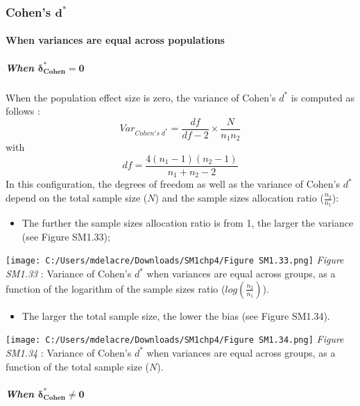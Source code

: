 \documentclass[
  english,
  man,mask,floatsintext]{apa6}
\providecommand{\tightlist}{%
  \setlength{\itemsep}{0pt}\setlength{\parskip}{0pt}}
\let\oldparagraph\paragraph
\renewcommand{\paragraph}[1]{\oldparagraph{#1}\mbox{}}
\let\oldsubparagraph\subparagraph
\renewcommand{\subparagraph}[1]{\oldsubparagraph{#1}\mbox{}}
\begin{document}
\hypertarget{cohens-bmd-1}{%
\subsubsection{\texorpdfstring{Cohen's \(\bm{d^*}\)}{Cohen's \textbackslash bm\{d\^{}*\}}}\label{cohens-bmd-1}}

\hypertarget{when-variances-are-equal-across-populations-4}{%
\paragraph{When variances are equal across populations}\label{when-variances-are-equal-across-populations-4}}

\hypertarget{when-bmdelta_cohen-0}{%
\subparagraph{\texorpdfstring{When \(\bm{\delta^*_{Cohen} = 0}\)}{When \textbackslash bm\{\textbackslash delta\^{}*\_\{Cohen\} = 0\}}}\label{when-bmdelta_cohen-0}}

When the population effect size is zero, the variance of Cohen's \(d^*\) is computed as follows :
\[Var_{Cohen's \; d^*} = \frac{df}{df-2} \times \frac{N}{n_1n_2}\]
with \[df = \frac{4(n_1-1)(n_2-1)}{n_1+n_2-2}\]
In this configuration, the degrees of freedom as well as the variance of Cohen's \(d^*\) depend on the total sample size (\(N\)) and the sample sizes allocation ratio (\(\frac{n_2}{n_1}\)):

\begin{itemize}
\tightlist
\item
  The further the sample sizes allocation ratio is from 1, the larger the variance (see Figure SM1.33);
\end{itemize}

\texttt{[image: C:/Users/mdelacre/Downloads/SM1chp4/Figure SM1.33.png]}
\emph{Figure SM1.33} : Variance of Cohen's \(d^*\) when variances are equal across groups, as a function of the logarithm of the sample sizes ratio (\(log\left(\frac{n_2}{n_1} \right)\)).

\begin{itemize}
\tightlist
\item
  The larger the total sample size, the lower the bias (see Figure SM1.34).
\end{itemize}

\texttt{[image: C:/Users/mdelacre/Downloads/SM1chp4/Figure SM1.34.png]}
\emph{Figure SM1.34} : Variance of Cohen's \(d^*\) when variances are equal across groups, as a function of the total sample size (\(N\)).

\hypertarget{when-bmdelta_cohen-neq-0}{%
\subparagraph{\texorpdfstring{When \(\bm{\delta^*_{Cohen} \neq 0}\)}{When \textbackslash bm\{\textbackslash delta\^{}*\_\{Cohen\} \textbackslash neq 0\}}}\label{when-bmdelta_cohen-neq-0}}
\end{document}
